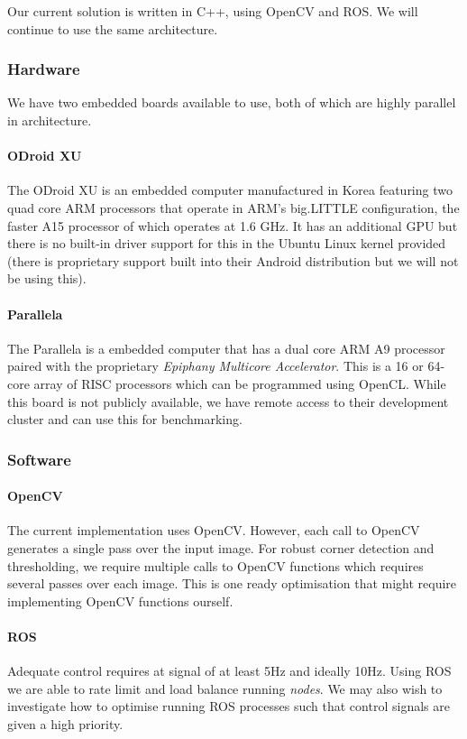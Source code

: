 \documentclass[10pt, twocolumn]{scrartcl} %
\begin{document}
Our current solution is written in C++, using OpenCV and ROS. We will continue to use the same architecture.

\subsubsection*{Hardware}
We have two embedded boards available to use, both of which are highly parallel in architecture. 

\paragraph{ODroid XU}
The ODroid XU is an embedded computer manufactured in Korea featuring two quad core ARM processors that operate in ARM's big.LITTLE configuration, the faster A15 processor of which operates at 1.6 GHz. It has an additional GPU but there is no built-in driver support for this in the Ubuntu Linux kernel provided (there is proprietary support built into their Android distribution but we will not be using this).

\paragraph{Parallela}
The Parallela is a embedded computer that has a dual core ARM A9 processor paired with the proprietary \textit{Epiphany Multicore Accelerator}. This is a 16 or 64-core array of RISC processors which can be programmed using OpenCL. While this board is not publicly available, we have remote access to their development cluster and can use this for benchmarking.

\subsubsection*{Software}
\paragraph{OpenCV}
The current implementation uses OpenCV. However, each call to OpenCV generates a single pass over the input image. For robust corner detection and thresholding, we require multiple calls to OpenCV functions which requires several passes over each image. This is one ready optimisation that might require implementing OpenCV functions ourself.

\paragraph{ROS}
Adequate control requires at signal of at least 5Hz and ideally 10Hz. Using ROS we are able to rate limit and load balance running \textit{nodes}. We may also wish to investigate how to optimise running ROS processes such that control signals are given a high priority.
\end{document}

